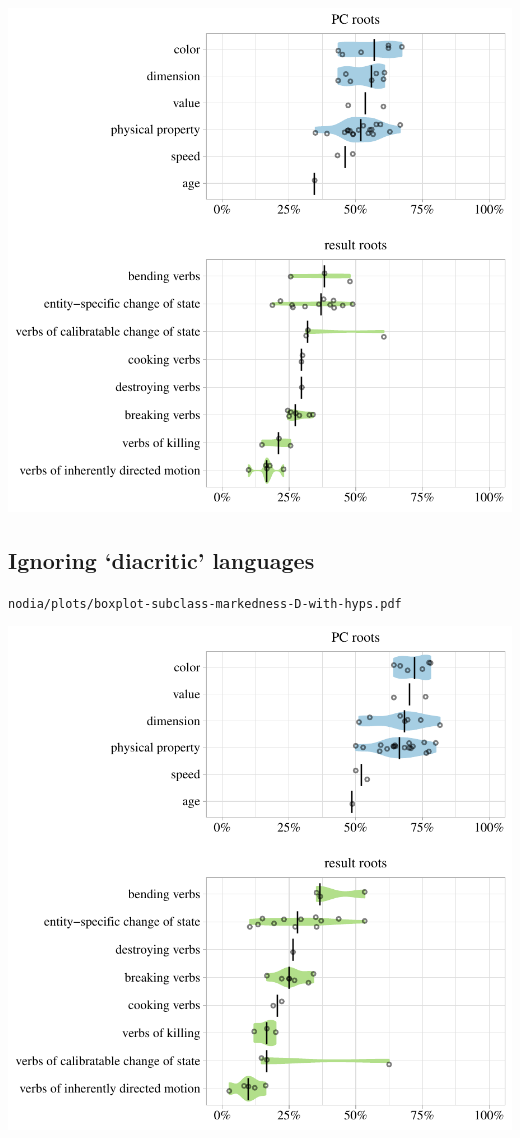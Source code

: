 \includegraphics[width=1.0\textwidth]{../nolow/plots/boxplot-subclass-markedness-D-with-hyps.pdf}

\subsection{Ignoring `diacritic' languages}

\texttt{nodia/plots/boxplot-subclass-markedness-D-with-hyps.pdf}

\includegraphics[width=1.0\textwidth]{../nodia/plots/boxplot-subclass-markedness-D-with-hyps.pdf}

